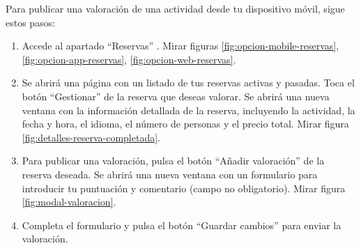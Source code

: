 Para publicar una valoración de una actividad desde tu dispositivo móvil, sigue estos pasos:
\begin{enumerate}
	\item Accede al apartado “Reservas” . Mirar figuras \ref{fig:opcion-mobile-reservas}, \ref{fig:opcion-app-reservas}, \ref{fig:opcion-web-reservas}.

	\item Se abrirá una página con un listado de tus reservas activas y pasadas. Toca el botón “Gestionar” de la reserva que deseas valorar.
	      Se abrirá una nueva ventana con la información detallada de la reserva, incluyendo la actividad, la fecha y hora, el idioma, el número de personas y el precio total.
	      Mirar figura \ref{fig:detalles-reserva-completada}.
	\item Para publicar una valoración, pulsa el botón “Añadir valoración” de la reserva deseada. Se abrirá una nueva ventana con un formulario para introducir tu puntuación y comentario (campo no obligatorio).
	      Mirar figura \ref{fig:modal-valoracion}.
	\item Completa el formulario y pulsa el botón “Guardar cambios” para enviar la valoración.
\end{enumerate}


